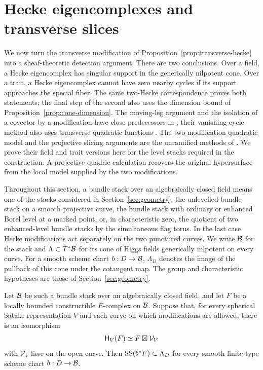 \section{Hecke eigencomplexes and transverse slices}\label{sec:detection}

We now turn the transverse modification of
Proposition~\ref{prop:transverse-hecke} into a sheaf-theoretic detection
argument.  There are two conclusions.  Over a field, a Hecke eigencomplex
has singular support in the generically nilpotent cone.  Over a trait, a Hecke
eigencomplex cannot have zero nearby cycles if its support approaches the
special fiber.  The same two-Hecke correspondence proves both statements;
the final step of the second also uses the dimension bound of
Proposition~\ref{prop:cone-dimension}.
The moving-leg argument and the isolation of a covector by a modification
have close predecessors in \cite[\S\S20.5--20.8]{AGKRRV}; their
vanishing-cycle method also uses transverse quadratic functions
\cite[Appendix~H, especially Remark~H.2.5]{AGKRRV}. The two-modification
quadratic model and the projective slicing arguments are the unramified
methods of \cite[Proposition~5.1, Section~6, and Lemma~7.2]{OpenAIFullSupport2026}.
We prove their field and trait versions here for the level stacks required
in the construction. A projective quadric calculation recovers the original
hypersurface from the local model supplied by the two modifications.

Throughout this section, a bundle stack over an algebraically closed field
means one of the stacks considered in Section~\ref{sec:geometry}: the
unlevelled bundle stack on a smooth projective curve, the bundle stack with
ordinary or enhanced Borel level at a marked point, or, in characteristic
zero, the quotient of two enhanced-level bundle stacks by the simultaneous
flag torus.  In the last case Hecke modifications act separately on the two
punctured curves.  We write $\mathcal B$ for the stack and $\Lambda\subset T^*\mathcal B$
for its cone of Higgs fields generically nilpotent on every curve.  For a
smooth scheme chart $b:D\to\mathcal B$, $\Lambda_D$ denotes the image of the
pullback of this cone under the cotangent map.  The group and characteristic
hypotheses are those of Section~\ref{sec:geometry}.

\begin{theorem}\label{thm:nilpotent-detection}
Let $\mathcal B$ be such a bundle stack over an algebraically closed field, and
let $F$ be a locally bounded constructible $E$-complex on $\mathcal B$.  Suppose
that, for every spherical Satake representation $V$ and each curve on
which modifications are allowed, there is an isomorphism
\[
                  \mathsf H_V(F)\simeq F\boxtimes\mathcal V_V
\]
with $\mathcal V_V$ lisse on the open curve.  Then
$\operatorname{SS}(b^*F)\subset\Lambda_D$ for every smooth finite-type scheme chart
$b:D\to\mathcal B$.
\end{theorem}

